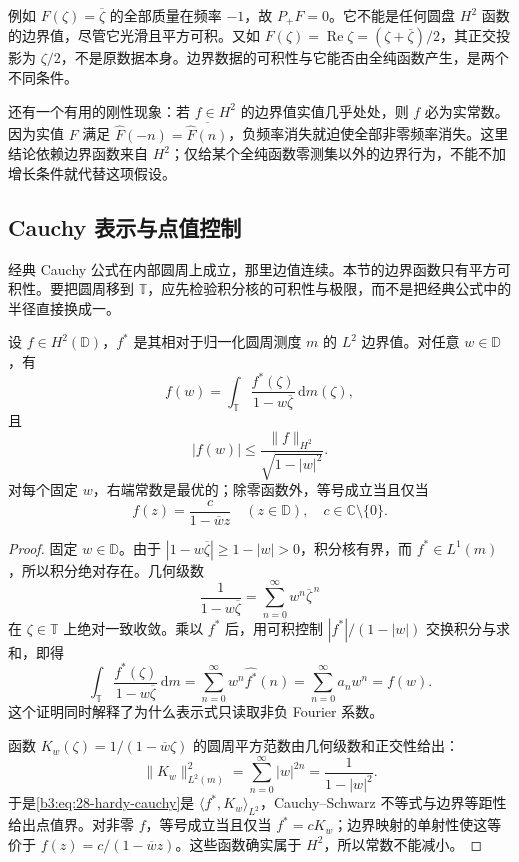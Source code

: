 例如 \(F(\zeta)=\overline\zeta\) 的全部质量在频率 \(-1\)，故 \(P_+F=0\)。它不能是任何圆盘 \(H^2\) 函数的边界值，尽管它光滑且平方可积。又如 \(F(\zeta)=\operatorname{Re}\zeta=(\zeta+\overline\zeta)/2\)，其正交投影为 \(\zeta/2\)，不是原数据本身。边界数据的可积性与它能否由全纯函数产生，是两个不同条件。

\ProseParagraphBreak
还有一个有用的刚性现象：若 \(f\in H^2\) 的边界值实值几乎处处，则 \(f\) 必为实常数。因为实值 \(F\) 满足 \(\widehat F(-n)=\overline{\widehat F(n)}\)，负频率消失就迫使全部非零频率消失。这里结论依赖边界函数来自 \(H^2\)；仅给某个全纯函数零测集以外的边界行为，不能不加增长条件就代替这项假设。

\subsection{Cauchy 表示与点值控制}
\label{b3:subsec:280203}

经典 Cauchy 公式在内部圆周上成立，那里边值连续。本节的边界函数只有平方可积性。要把圆周移到 \(\mathbb T\)，应先检验积分核的可积性与极限，而不是把经典公式中的半径直接换成一。

\begin{proposition}\label{b3:prop:28-hardy-cauchy}
设 \(f\in H^2(\mathbb D)\)，\(f^*\) 是其相对于归一化圆周测度 \(m\) 的 \(L^2\) 边界值。对任意 \(w\in\mathbb D\)，有
\begin{equation}\label{b3:eq:28-hardy-cauchy}
 f(w)=\int_{\mathbb T}
       \frac{f^*(\zeta)}{1-w\overline\zeta}\,\mathrm dm(\zeta),
\end{equation}
且
\begin{equation}\label{b3:eq:28-hardy-point-evaluation}
 |f(w)|\le\frac{\|f\|_{H^2}}{\sqrt{1-|w|^2}}.
\end{equation}
对每个固定 \(w\)，右端常数是最优的；除零函数外，等号成立当且仅当
\[
 f(z)=\frac{c}{1-\overline w z}
 \quad(z\in\mathbb D),\quad c\in\mathbb C\setminus\{0\}.
\]
\end{proposition}
\begin{proof}
固定 \(w\in\mathbb D\)。由于 \(|1-w\overline\zeta|\ge1-|w|>0\)，积分核有界，而 \(f^*\in L^1(m)\)，所以积分绝对存在。几何级数
\[
 \frac1{1-w\overline\zeta}
 =\sum_{n=0}^{\infty}w^n\overline\zeta^{\,n}
\]
在 \(\zeta\in\mathbb T\) 上绝对一致收敛。乘以 \(f^*\) 后，用可积控制 \(|f^*|/(1-|w|)\) 交换积分与求和，即得
\[
 \int_{\mathbb T}\frac{f^*(\zeta)}{1-w\overline\zeta}\,\mathrm dm
 =\sum_{n=0}^{\infty}w^n\widehat{f^*}(n)
 =\sum_{n=0}^{\infty}a_nw^n=f(w).
\]
这个证明同时解释了为什么表示式只读取非负 Fourier 系数。

函数 \(K_w(\zeta)=1/(1-\overline w\zeta)\) 的圆周平方范数由几何级数和正交性给出：
\[
 \|K_w\|_{L^2(m)}^2
 =\sum_{n=0}^{\infty}|w|^{2n}
 =\frac1{1-|w|^2}.
\]
于是\eqref{b3:eq:28-hardy-cauchy}是 \(\langle f^*,K_w\rangle_{L^2}\)，Cauchy--Schwarz 不等式与边界等距性给出点值界。对非零 \(f\)，等号成立当且仅当 \(f^*=cK_w\)；边界映射的单射性使这等价于 \(f(z)=c/(1-\overline w z)\)。这些函数确实属于 \(H^2\)，所以常数不能减小。
\end{proof}

